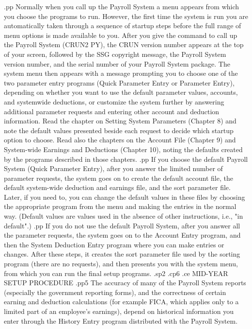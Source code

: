 .pp
Normally when you call up the Payroll System a menu appears from which
you choose the programs to run.  However, the first time the
system is run you are automatically taken
through a sequence of startup steps before the full range of menu options
is made available to you.
After you give the command to call
up the Payroll System (CRUN2 PY), the CRUN version number appears
at the top of your screen, followed by the SSG copyright message,
the Payroll System version number, and the serial number of your Payroll System
package.
The system menu then appears with a message prompting you to choose
one of the two parameter entry programs (Quick Parameter Entry or Parameter
Entry),
depending on whether you want to use
the default parameter values, accounts, and systemwide deductions,
or customize the system further by answering
additional parameter requests and entering other account and deduction
information.
Read the chapter on Setting System
Parameters (Chapter 8) and note the default values presented beside
each request to decide which startup option to choose.	Read also the
chapters on the Account File (Chapter 9) and System-wide Earnings and
Deductions (Chapter 10), noting the defaults created by the programs
described in those chapters.
.pp
If you choose
the default Payroll System (Quick Parameter Entry),
after you answer the limited number
of parameter requests, the system goes on to create the default
account file, the default system-wide deduction and earnings file,
and the sort parameter file.  Later, if you need to, you can change
the default values in these files by choosing the appropriate program
from the menu and making the entries in the normal way.  (Default values
are values used in the absence of other instructions, i.e., "in default".)
.pp
If you do not
use the default Payroll System, after you answer all the parameter requests,
the system goes on to the Account Entry program, and then the System
Deduction Entry program where you can make entries or changes.
After these steps, it creates the sort parameter file used by the sorting
program (there are no requests), and then presents you with the system
menu, from which you can run the final setup programs.
.sp2
.cp6
.ce
MID-YEAR SETUP PROCEDURE
.pp5
The accuracy of many of the Payroll System reports (especially the
government reporting forms), and the correctness of certain earning
and deduction calculations (for example FICA, which applies only to
a limited part of an employee's earnings), depend on historical
information you enter through the History Entry program distributed
with the Payroll System.
